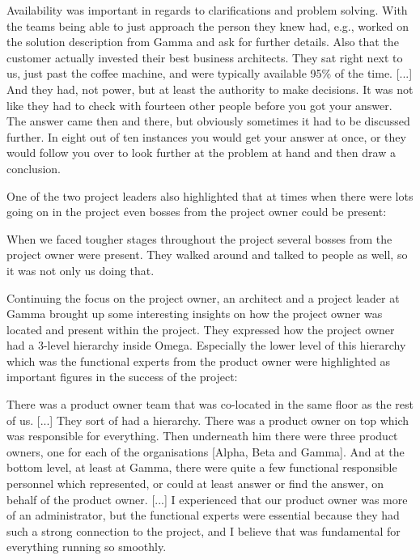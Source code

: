 \begin{fancyquotes}
Availability was important in regards to clarifications and problem solving. With the teams being able to just approach the person they knew had, e.g., worked on the solution description from Gamma and ask for further details. Also that the customer actually invested their best business architects. They sat right next to us, just past the coffee machine, and were typically available 95\% of the time. [...] And they had, not power, but at least the authority to make decisions. It was not like they had to check with fourteen other people before you got your answer. The answer came then and there, but obviously sometimes it had to be discussed further. In eight out of ten instances you would get your answer at once, or they would follow you over to look further at the problem at hand and then draw a conclusion.
\end{fancyquotes}

One of the two project leaders also highlighted that at times when there were lots going on in the project even bosses from the project owner could be present:

\begin{fancyquotes}
When we faced tougher stages throughout the project several bosses from the project owner were present. They walked around and talked to people as well, so it was not only us doing that.
\end{fancyquotes}

Continuing the focus on the project owner, an architect and a project leader at Gamma brought up some interesting insights on how the project owner was located and present within the project. They expressed how the project owner had a 3-level hierarchy inside Omega. Especially the lower level of this hierarchy which was the functional experts from the product owner were highlighted as important figures in the success of the project:

\begin{fancyquotes}
There was a product owner team that was co-located in the same floor as the rest of us. [...] They sort of had a hierarchy. There was a product owner on top which was responsible for everything. Then underneath him there were three product owners, one for each of the organisations [Alpha, Beta and Gamma]. And at the bottom level, at least at Gamma, there were quite a few functional responsible personnel which represented, or could at least answer or find the answer, on behalf of the product owner. [...] I experienced that our product owner was more of an administrator, but the functional experts were essential because they had such a strong connection to the project, and I believe that was fundamental for everything running so smoothly.
\end{fancyquotes}

